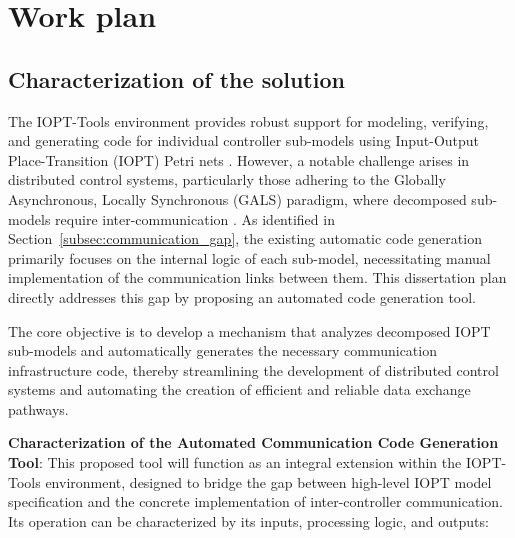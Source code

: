 
%

\chapter{Work plan}
\label{cha:work_plan}


\section{Characterization of the solution}
\label{sec:characterization_of_the_solution}

 The IOPT-Tools environment provides robust support for modeling, verifying, and generating code for individual controller sub-models using Input-Output Place-Transition (IOPT) Petri nets \cite{iopttools, barros2004, RefiningIOPT}. However, a notable challenge arises in distributed control systems, particularly those adhering to the Globally Asynchronous, Locally Synchronous (GALS) paradigm, where decomposed sub-models require inter-communication \cite{galsactd, Barrosadd}. As identified in Section~\ref{subsec:communication_gap}, the existing automatic code generation primarily focuses on the internal logic of each sub-model, necessitating manual implementation of the communication links between them. This dissertation plan directly addresses this gap by proposing an automated code generation tool.
 
 The core objective is to develop a mechanism that analyzes decomposed IOPT sub-models and automatically generates the necessary communication infrastructure code, thereby streamlining the development of distributed control systems and automating the creation of efficient and reliable data exchange pathways.
 
 
 
  \textbf{Characterization of the Automated Communication Code Generation Tool}: This proposed tool will function as an integral extension within the IOPT-Tools environment, designed to bridge the gap between high-level IOPT model specification and the concrete implementation of inter-controller communication. Its operation can be characterized by its inputs, processing logic, and outputs:

